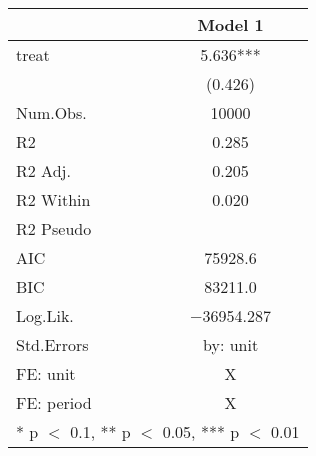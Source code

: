 \begin{table}
\centering
\begin{tabular}[t]{lc}
\toprule
  & Model 1\\
\midrule
treat & \num{5.636}***\\
 & (\num{0.426})\\
\midrule
Num.Obs. & \num{10000}\\
R2 & \num{0.285}\\
R2 Adj. & \num{0.205}\\
R2 Within & \num{0.020}\\
R2 Pseudo & \\
AIC & \num{75928.6}\\
BIC & \num{83211.0}\\
Log.Lik. & \num{-36954.287}\\
Std.Errors & by: unit\\
FE: unit & X\\
FE: period & X\\
\bottomrule
\multicolumn{2}{l}{\rule{0pt}{1em}* p $<$ 0.1, ** p $<$ 0.05, *** p $<$ 0.01}\\
\end{tabular}
\end{table}

